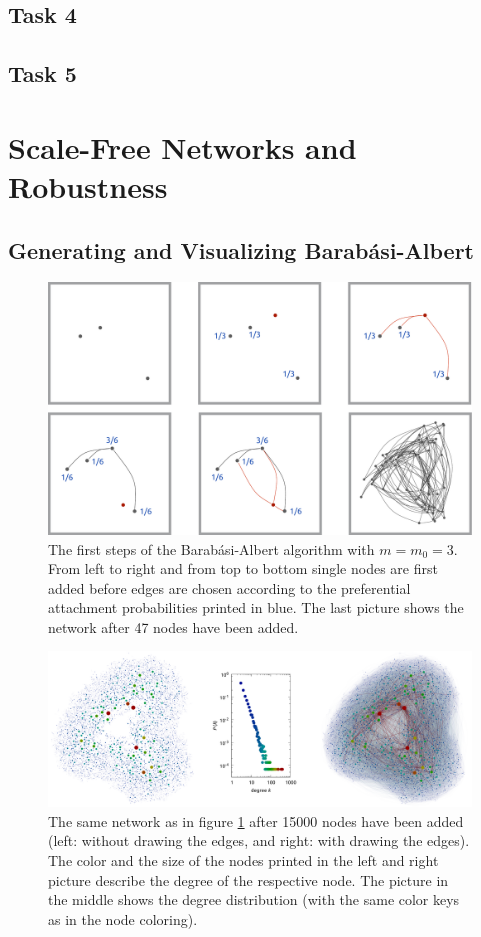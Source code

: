 \documentclass{scrartcl}
\begin{document}
\subsection{Task 4}
\subsection{Task 5}

\clearpage
\section{Scale-Free Networks and Robustness}
\subsection{Generating and Visualizing Barab\'asi-Albert}

\begin{figure}
    \includegraphics[width=\textwidth]{pictures/21_begin.pdf}
    \caption{The first steps of the Barab\'asi-Albert algorithm with $m
    = m_0 = 3$. From left to right and from top to bottom single nodes are
    first added before edges are chosen according to the preferential
    attachment probabilities printed in blue. The last picture shows the network
    after 47 nodes have been added.}
    \label{fig:21_begin}
\end{figure}

\begin{figure}
    \includegraphics[width=\textwidth]{pictures/21_end.pdf}
    \caption{The same network as in figure \ref{fig:21_begin} after 15000
    nodes have been added (left: without drawing the edges, and right: with
    drawing the edges). The color and the size of the nodes printed in the left
    and right picture describe the degree of the respective node. The
    picture in the middle shows the degree distribution (with the same color
    keys as in the node coloring).}
    \label{fig:21_end}
\end{figure}
\end{document}

